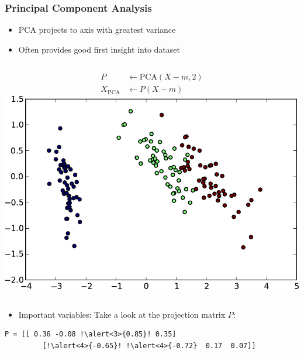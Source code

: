 \begin{frame}[fragile]
  \frametitle{Principal Component Analysis}
  \begin{itemize}
  \item PCA projects to axis with greatest \alert{variance}
  \item Often provides good \alert{first insight} into dataset
  \end{itemize}

  \begin{columns}
    \begin{align*}
        P &\leftarrow \mathrm{PCA}(X-m, 2)\\
        X_{\mathrm{PCA}} & \leftarrow P (X-m)
    \end{align*}
    \includegraphics[width=.99\linewidth]{pca-pics/iris-2d}
  \end{columns}

  \pause
  \begin{itemize}
  \item Important variables: Take a look at the projection matrix $P$:
  \end{itemize}

  \begin{lstlisting}[escapechar=!]
    P = [[ 0.36 -0.08 !\alert<3>{0.85}! 0.35]
         [!\alert<4>{-0.65}! !\alert<4>{-0.72}  0.17  0.07]]
  \end{lstlisting}
\end{frame}

